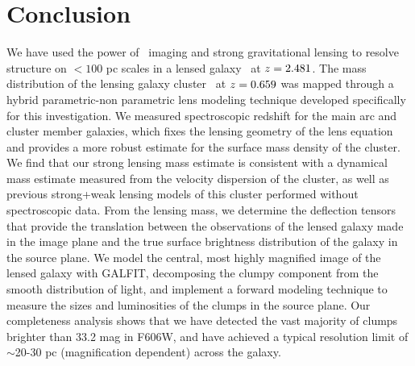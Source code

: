\section{Conclusion}
\label{chap4:sec:conclusion}

We have used the power of \hst\ imaging and strong gravitational lensing to resolve structure on $<100$ pc scales in a lensed galaxy \giantarc\ at $z=2.481$. The mass distribution of the lensing galaxy cluster \cluster\ at $z=0.659$ was mapped through a hybrid parametric-non parametric lens modeling technique developed specifically for this investigation. We measured spectroscopic redshift for the main arc and cluster member galaxies, which fixes the lensing geometry of the lens equation and provides a more robust estimate for the surface mass density of the cluster. We find that our strong lensing mass estimate is consistent with a dynamical mass estimate measured from the velocity dispersion of the cluster, as well as previous strong+weak lensing models of this cluster performed without spectroscopic data. From the lensing mass, we determine the deflection tensors that provide the translation between the observations of the lensed galaxy made in the image plane and the true surface brightness distribution of the galaxy in the source plane. We model the central, most highly magnified image of the lensed galaxy with GALFIT, decomposing the clumpy component from the smooth distribution of light, and implement a forward modeling technique to measure the sizes and luminosities of the clumps in the source plane. Our completeness analysis shows that we have detected the vast majority of clumps brighter than 33.2 mag in F606W, and have achieved a typical resolution limit of $\sim$20-30 pc (magnification dependent) across the galaxy.

